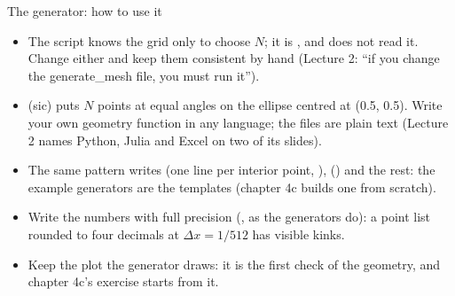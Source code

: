 \documentclass[aspectratio=169,11pt]{beamer}
\begin{document}
\begin{frame}{The generator: how to use it}
\label{fr:generator2}
\small
\begin{itemize}
  \item The script knows the grid only to choose $N$; it is , and  does not read it. Change either and keep them consistent by hand (Lecture 2: ``if you change the generate\_mesh file, you must run it'').
  \item {} (sic) puts $N$ points at equal angles on the ellipse centred at (0.5, 0.5). Write your own geometry function in any language; the files are plain text (Lecture 2 names Python, Julia and Excel on two of its slides).
  \item The same pattern writes  (one line per interior point, ),  () and the rest: the example generators are the templates (chapter 4c builds one from scratch).
  \item Write the numbers with full precision (, as the generators do): a point list rounded to four decimals at $\Delta x = 1/512$ has visible kinks.
  \item Keep the plot the generator draws: it is the first check of the geometry, and chapter 4c's exercise starts from it.
\end{itemize}
\end{frame}
\end{document}
